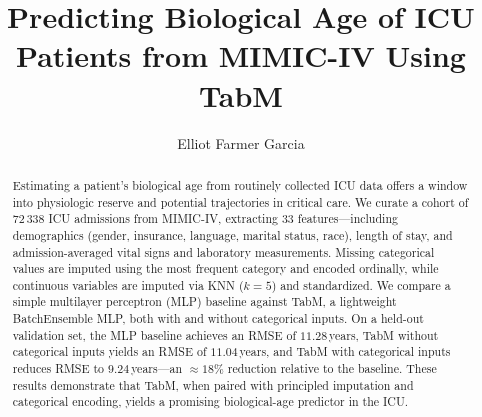 \documentclass[manuscript,screen,review]{acmart}
\begin{document}
\title{Predicting Biological Age of ICU Patients from MIMIC-IV Using TabM}

\author{Elliot Farmer Garcia}

\renewcommand{\shortauthors}{Farmer Garcia}

\begin{abstract}
Estimating a patient’s biological age from routinely collected ICU data offers a window into physiologic reserve and potential trajectories in critical care. We curate a cohort of 72\,338 ICU admissions from MIMIC-IV, extracting 33 features—including demographics (gender, insurance, language, marital status, race), length of stay, and admission-averaged vital signs and laboratory measurements. Missing categorical values are imputed using the most frequent category and encoded ordinally, while continuous variables are imputed via KNN ($k=5$) and standardized. We compare a simple multilayer perceptron (MLP) baseline against TabM, a lightweight BatchEnsemble MLP, both with and without categorical inputs. On a held-out validation set, the MLP baseline achieves an RMSE of $11.28\,$years, TabM without categorical inputs yields an RMSE of $11.04\,$years, and TabM with categorical inputs reduces RMSE to $9.24\,$years—an $\approx18\%$ reduction relative to the baseline. These results demonstrate that TabM, when paired with principled imputation and categorical encoding, yields a promising biological-age predictor in the ICU.
\end{abstract}
\end{document}
